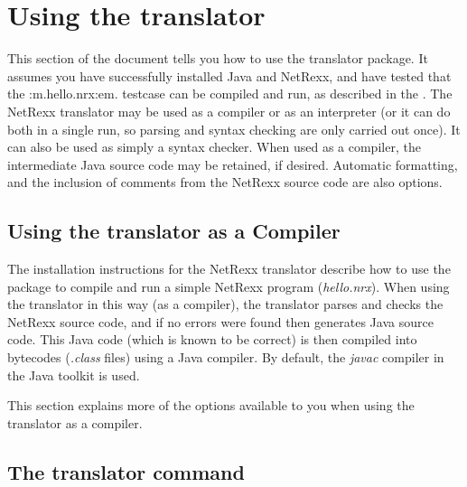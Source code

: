 

\chapter{Using the translator}
This section of the document tells you how to use the
translator package.  It assumes you have successfully installed Java and
NetRexx, and have tested that the :m.hello.nrx:em. testcase can be
compiled and run, as described in the \cite{Testing the
NetRexx Installation}.
\newline
The NetRexx translator may be used as a compiler or as an interpreter
(or it can do both in a single run, so parsing and syntax checking are
only carried out once).  It can also be used as simply a syntax checker.
\newline
When used as a compiler, the intermediate Java source code may be
retained, if desired.  Automatic formatting, and the inclusion of comments
from the NetRexx source code are also options.

\section{Using the translator as a Compiler}
The installation instructions for the NetRexx translator describe how to
use the package to compile and run a simple NetRexx program
(\emph{hello.nrx}).  When using the translator in this way (as a
compiler), the translator parses and checks the NetRexx source code, and
if no errors were found then generates Java source code.  This Java code
(which is known to be correct) is then compiled into bytecodes
(\emph{.class} files) using a Java compiler.  By default,
the \emph{javac} compiler in the Java toolkit is used.

This section explains more of the options available to you when using
the translator as a compiler.
\section{The translator command}

